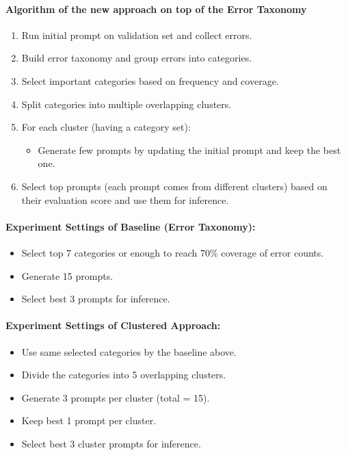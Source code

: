 \documentclass[12pt]{article}
\begin{document}
\paragraph{Algorithm of the new approach on top of the Error Taxonomy}
\begin{enumerate}
    \item Run initial prompt on validation set and collect errors.
    \item Build error taxonomy and group errors into categories.
    \item Select important categories based on frequency and coverage.
    \item Split categories into multiple overlapping clusters.
    \item For each cluster (having a category set):
    \begin{itemize}
        \item Generate few prompts by updating the initial prompt and keep the best one.
    \end{itemize}
    \item Select top prompts (each prompt comes from different clusters) based on their evaluation score and use them for inference.
\end{enumerate}

\paragraph{Experiment Settings of Baseline (Error Taxonomy):}
\begin{itemize}
    \item Select top 7 categories or enough to reach 70\% coverage of error counts.
    \item Generate 15 prompts.
    \item Select best 3 prompts for inference.
\end{itemize}

\paragraph{Experiment Settings of Clustered Approach:}
\begin{itemize}
    \item Use same selected categories by the baseline above.
    \item Divide the categories into 5 overlapping clusters.
    \item Generate 3 prompts per cluster (total = 15).
    \item Keep best 1 prompt per cluster.
    \item Select best 3 cluster prompts for inference.
\end{itemize}
\end{document}
